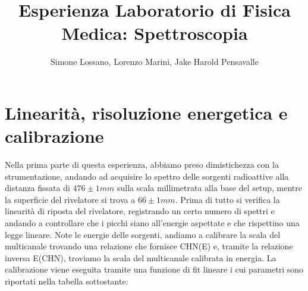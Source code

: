 \documentclass[a4paper]{article}
\title{Esperienza Laboratorio di Fisica Medica: Spettroscopia}
\author{Simone Lossano, Lorenzo Marini, Jake Harold Pensavalle}
\begin{document}
	\maketitle
	\newpage
	\tableofcontents
	\newpage
\section{Linearità, risoluzione energetica e calibrazione}
Nella prima parte di questa esperienza, abbiamo preso dimistichezza con la strumentazione, andando ad acquisire lo spettro delle sorgenti radioattive alla distanza fissata di $476 \pm 1 mm$ sulla scala millimetrata alla base del setup, mentre la superficie del rivelatore si trova a $66 \pm 1 mm$.
Prima di tutto si verifica la linearità di riposta del rivelatore, registrando un certo numero di spettri e andando a controllare che i picchi siano all'energie aspettate e che rispettino una legge lineare. 
Note le energie delle sorgenti, andiamo a calibrare la scala del multicanale trovando una relazione che fornisce CHN(E) e, tramite la relazione inversa E(CHN), troviamo la scala del multicanale calibrata in energia. La calibrazione viene eseguita tramite una funzione di fit lineare i cui parametri sono riportati nella tabella sottostante:
\end{document}
